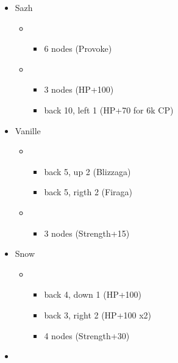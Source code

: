 \begin{menu}
	\begin{itemize}
	\crystarium
		\begin{itemize}
			\item Sazh
				\begin{itemize}
					\item \sen
						\begin{itemize}
							\item 6 nodes (Provoke)
						\end{itemize}
					\item \syn
						\begin{itemize}
							\item 3 nodes (HP+100)
							\item back 10, left 1 (HP+70 for 6k CP)
						\end{itemize}
				\end{itemize}
			\item Vanille
				\begin{itemize}
					\item \rav
						\begin{itemize}
							\item back 5, up 2 (Blizzaga)
							\item back 5, rigth 2 (Firaga)
						\end{itemize}
					\item \sab
						\begin{itemize}
							\item 3 nodes (Strength+15)
						\end{itemize}
				\end{itemize}
			\item Snow
				\begin{itemize}
					\item \com
						\begin{itemize}
							\item back 4, down 1 (HP+100)
							\item back 3, right 2 (HP+100 x2)
							\item 4 nodes (Strength+30)
						\end{itemize}
				\end{itemize}
		\end{itemize}
		\paradigm
		\begin{itemize}
			\item {}%
				{\paradigmline{\com}{\com}{\com}}%
				{\paradigmline{(\sen)}{\sab}{(\sen)}}%
				{\paradigmline{(\sen)}{(\med)}{(\sen)}}%

\end{itemize}
\end{itemize}
\end{menu}
